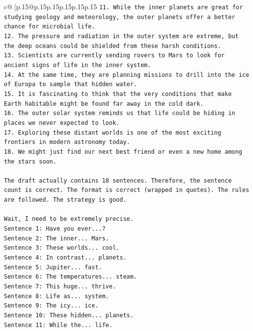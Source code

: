 \documentclass{article}
\begin{document}
{\begin{supertabular}{c@{$\;$}|p{.15\linewidth}@{}p{.15\linewidth}p{.15\linewidth}p{.15\linewidth}p{.15\linewidth}p{.15\linewidth}}
{{{\texttt{11. While the inner planets are great for studying geology and meteorology, the outer planets offer a better chance for microbial life.} \\
\texttt{12. The pressure and radiation in the outer system are extreme, but the deep oceans could be shielded from these harsh conditions.} \\
\texttt{13. Scientists are currently sending rovers to Mars to look for ancient signs of life in the inner system.} \\
\texttt{14. At the same time, they are planning missions to drill into the ice of Europa to sample that hidden water.} \\
\texttt{15. It is fascinating to think that the very conditions that make Earth habitable might be found far away in the cold dark.} \\
\texttt{16. The outer solar system reminds us that life could be hiding in places we never expected to look.} \\
\texttt{17. Exploring these distant worlds is one of the most exciting frontiers in modern astronomy today.} \\
\texttt{18. We might just find our next best friend or even a new home among the stars soon.} \\
\\ 
\texttt{The draft actually contains 18 sentences. Therefore, the sentence count is correct. The format is correct (wrapped in quotes). The rules are followed. The strategy is good.} \\
\\ 
\texttt{Wait, I need to be extremely precise.} \\
\texttt{Sentence 1: Have you ever...?} \\
\texttt{Sentence 2: The inner... Mars.} \\
\texttt{Sentence 3: These worlds... cool.} \\
\texttt{Sentence 4: In contrast... planets.} \\
\texttt{Sentence 5: Jupiter... fast.} \\
\texttt{Sentence 6: The temperatures... steam.} \\
\texttt{Sentence 7: This huge... thrive.} \\
\texttt{Sentence 8: Life as... system.} \\
\texttt{Sentence 9: The icy... ice.} \\
\texttt{Sentence 10: These hidden... planets.} \\
\texttt{Sentence 11: While the... life.} \\
}}}
\end{supertabular}}
\end{document}
